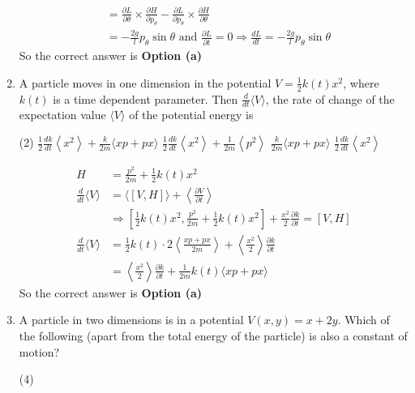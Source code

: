 \begin{enumerate}
\begin{answer}
\begin{align*}
	[L, H]&=\frac{\partial L}{\partial \theta} \times \frac{\partial H}{\partial p_{\theta}}-\frac{\partial L}{\partial p_{\theta}} \times \frac{\partial H}{\partial \theta}\\&=-\frac{2 g}{l} p_{\theta} \sin \theta\text{ and }\frac{\partial L}{\partial t}=0 \Rightarrow \frac{d L}{d t}=-\frac{2 g}{l} p_{\theta} \sin \theta
	\end{align*}
	So the correct answer is \textbf{Option (a)}
\end{answer}
	\item  A particle moves in one dimension in the potential $V=\frac{1}{2} k(t) x^{2}$, where $k(t)$ is a time dependent parameter. Then $\frac{d}{d t}\langle V\rangle$, the rate of change of the expectation value $\langle V\rangle$ of the potential energy is
	{}
	\begin{tasks}(2)
		\task[\textbf{a.}]$\frac{1}{2} \frac{d k}{d t}\left\langle x^{2}\right\rangle+\frac{k}{2 m}\langle x p+p x\rangle$
		\task[\textbf{b.}] $\frac{1}{2} \frac{d k}{d t}\left\langle x^{2}\right\rangle+\frac{1}{2 m}\left\langle p^{2}\right\rangle$
		\task[\textbf{c.}]$\frac{k}{2 m}\langle x p+p x\rangle$
		\task[\textbf{d.}]  $\frac{1}{2} \frac{d k}{d t}\left\langle x^{2}\right\rangle$
	\end{tasks}
\begin{answer}
	\begin{align*}
	H&=\frac{p^{2}}{2 m}+\frac{1}{2} k(t) x^{2}\\
	\frac{d}{d t}\langle V\rangle&=\langle[V, H]\rangle+\left\langle\frac{\partial V}{\partial t}\right\rangle \\&\Rightarrow\left[\frac{1}{2} k(t) x^{2}, \frac{p^{2}}{2 m}+\frac{1}{2} k(t) x^{2}\right]+\frac{x^{2}}{2} \frac{\partial k}{\partial t}=[V, H]\\
	\frac{d}{d t}\langle V\rangle&=\frac{1}{2} k(t) \cdot 2\left\langle\frac{x p+p x}{2 m}\right\rangle+\left\langle\frac{x^{2}}{2}\right\rangle \frac{\partial k}{\partial t}\\&=\left\langle\frac{x^{2}}{2}\right\rangle \frac{\partial k}{\partial t}+\frac{1}{2 m} k(t)\langle x p+p x\rangle
	\end{align*}
	So the correct answer is \textbf{Option (a)}
\end{answer}
	\item  A particle in two dimensions is in a potential $V(x, y)=x+2 y$. Which of the following (apart from the total energy of the particle) is also a constant of motion?
	{}
	\begin{tasks}(4)

\end{tasks}
\end{enumerate}
